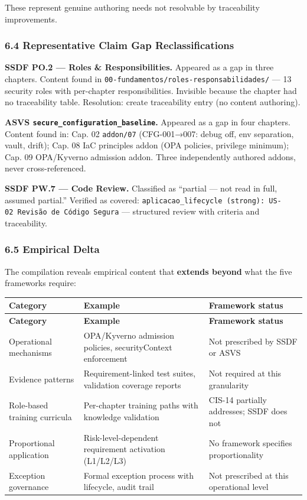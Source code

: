 \documentclass[
]{article}
\begin{document}
These represent genuine authoring needs not resolvable by traceability
improvements.

\subsubsection{6.4 Representative Claim Gap
Reclassifications}\label{representative-claim-gap-reclassifications}

\textbf{SSDF PO.2 --- Roles \& Responsibilities.} Appeared as a gap in
three chapters. Content found in
\texttt{00-fundamentos/roles-responsabilidades/} --- 13 security roles
with per-chapter responsibilities. Invisible because the chapter had no
traceability table. Resolution: create traceability entry (no content
authoring).

\textbf{ASVS \texttt{secure\_configuration\_baseline}.} Appeared as a
gap in four chapters. Content found in: Cap. 02 \texttt{addon/07}
(CFG-001→007: debug off, env separation, vault, drift); Cap. 08 IaC
principles addon (OPA policies, privilege minimum); Cap. 09 OPA/Kyverno
admission addon. Three independently authored addons, never
cross-referenced.

\textbf{SSDF PW.7 --- Code Review.} Classified as ``partial --- not read
in full, assumed partial.'' Verified as covered:
\texttt{aplicacao\_lifecycle\ (strong):\ US-02\ Revisão\ de\ Código\ Segura}
--- structured review with criteria and traceability.

\subsubsection{6.5 Empirical Delta}\label{empirical-delta}

The compilation reveals empirical content that \textbf{extends beyond}
what the five frameworks require:

\begin{longtable}{@{}L{3.35cm}L{4.85cm}L{4.8cm}@{}}
\toprule
\textbf{Category} & \textbf{Example} & \textbf{Framework status} \\
\midrule
\endfirsthead
\toprule
\textbf{Category} & \textbf{Example} & \textbf{Framework status} \\
\midrule
\endhead
\bottomrule
\endfoot
\bottomrule
\endlastfoot
Operational mechanisms & OPA/Kyverno admission policies, securityContext enforcement & Not prescribed by SSDF or ASVS \\
Evidence patterns & Requirement-linked test suites, validation coverage reports & Not required at this granularity \\
Role-based training curricula & Per-chapter training paths with knowledge validation & CIS-14 partially addresses; SSDF does not \\
Proportional application & Risk-level-dependent requirement activation (L1/L2/L3) & No framework specifies proportionality \\
Exception governance & Formal exception process with lifecycle, audit trail & Not prescribed at this operational level \\
\end{longtable}
\end{document}
